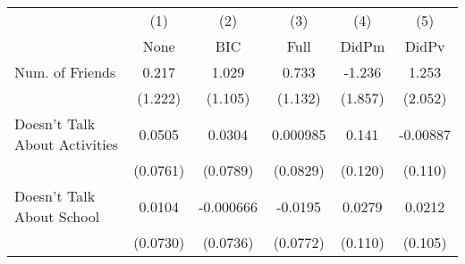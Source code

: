{
\def\sym#1{\ifmmode^{#1}\else\(^{#1}\)\fi}
\begin{tabular}{l*{5}{c}}
\toprule
            &\multicolumn{1}{c}{(1)}&\multicolumn{1}{c}{(2)}&\multicolumn{1}{c}{(3)}&\multicolumn{1}{c}{(4)}&\multicolumn{1}{c}{(5)}\\
            &\multicolumn{1}{c}{None}&\multicolumn{1}{c}{BIC}&\multicolumn{1}{c}{Full}&\multicolumn{1}{c}{DidPm}&\multicolumn{1}{c}{DidPv}\\
\midrule
Num. of Friends&       0.217         &       1.029         &       0.733         &      -1.236         &       1.253         \\
            &     (1.222)         &     (1.105)         &     (1.132)         &     (1.857)         &     (2.052)         \\
\addlinespace
Doesn't Talk About Activities&      0.0505         &      0.0304         &    0.000985         &       0.141         &    -0.00887         \\
            &    (0.0761)         &    (0.0789)         &    (0.0829)         &     (0.120)         &     (0.110)         \\
\addlinespace
Doesn't Talk About School&      0.0104         &   -0.000666         &     -0.0195         &      0.0279         &      0.0212         \\
            &    (0.0730)         &    (0.0736)         &    (0.0772)         &     (0.110)         &     (0.105)         \\
\bottomrule
\end{tabular}
}
